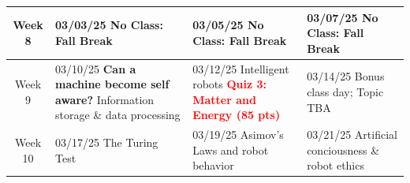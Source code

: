 \documentclass[11pt]{article}
\begin{document}
\begin{tabularx}{\textwidth}{|c|X|X|X|}

    \hline
    Week 8 & 
    
    \cellcolor{gray!20}03/03/25 \newline
    \textbf{No Class: Fall Break} 
    &
    
    \cellcolor{gray!20}03/05/25 \newline
    \textbf{No Class: Fall Break} 
    &

    \cellcolor{gray!20}03/07/25 \newline
    \textbf{No Class: Fall Break} 
    \\

    \hline
    Week 9 & 
    
    03/10/25 \newline
    \textbf{Can a machine become self aware?}\newline
    Information storage \& data processing \newline\newline
    &
    
    03/12/25 \newline
    \newline
    Intelligent robots \newline\newline
    \textcolor{red}{\textbf{Quiz 3: Matter and Energy (85 pts)}} &

    03/14/25 \newline
    \newline
    Bonus class day; Topic TBA \newline\newline
    \\
    \hline
    Week 10 & 
    
    03/17/25 \newline
    \newline
    The Turing Test \newline\newline
    &
    
    03/19/25 \newline
    \newline
    Asimov's Laws and robot behavior \newline\newline
    &

    03/21/25 \newline
    \newline
    Artificial conciousness \& robot ethics \newline
    

\end{tabularx}
\end{document}
